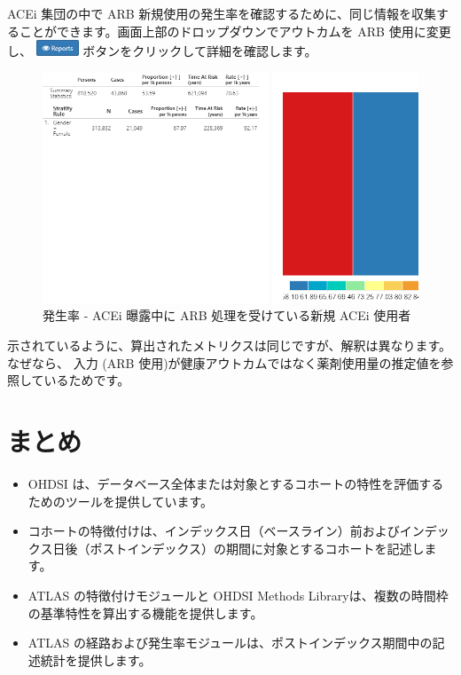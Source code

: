 \documentclass[
  11pt]{book}
\makeatletter
\newenvironment{kframe}{%
\medskip{}
\setlength{\fboxsep}{.8em}
 \def\at@end@of@kframe{}%
 \ifinner\ifhmode%
  \def\at@end@of@kframe{\end{minipage}}%
  \begin{minipage}{\columnwidth}%
 \fi\fi%
 \def\FrameCommand##1{\hskip\@totalleftmargin \hskip-\fboxsep
 \colorbox{myShadeColor}{##1}\hskip-\fboxsep
     \hskip-\linewidth \hskip-\@totalleftmargin \hskip\columnwidth}%
 \MakeFramed {\advance\hsize-\width
   \@totalleftmargin\z@ \linewidth\hsize
   \@setminipage}}%
 {\par\unskip\endMakeFramed%
 \at@end@of@kframe}
\newenvironment{rmdblock}[1]
  {
  \begin{itemize}
  \renewcommand{\labelitemi}{
    \raisebox{-.7\height}[0pt][0pt]{
      {\setkeys{Gin}{width=3em,keepaspectratio}\texttt{[image: images/\#1]}}
    }
  }
  \setlength{\fboxsep}{1em}
  \begin{kframe}
  \item
  }
  {
  \end{kframe}
  \end{itemize}
  }
\newenvironment{rmdsummary}
  {\begin{rmdblock}{summary}}
  {\end{rmdblock}}
\theoremstyle{definition}
\theoremstyle{definition}
\theoremstyle{definition}
\theoremstyle{definition}
\theoremstyle{remark}
\makeatother
\begin{document}
ACEi 集団の中で ARB 新規使用の発生率を確認するために、同じ情報を収集することができます。画面上部のドロップダウンでアウトカムを ARB 使用に変更し、 \includegraphics{images/Characterization/atlasIncidenceReportButton.png} ボタンをクリックして詳細を確認します。

\begin{figure}

{\centering \includegraphics[width=1\linewidth]{images/Characterization/atlasIncidenceResultsARB} 

}

\caption{発生率 - ACEi 曝露中に ARB 処理を受けている新規 ACEi 使用者}\label{fig:atlasIncidenceResultsARB}
\end{figure}

示されているように、算出されたメトリクスは同じですが、解釈は異なります。なぜなら、 入力 (ARB 使用)が健康アウトカムではなく薬剤使用量の推定値を参照しているためです。

\section{まとめ}\label{ux307eux3068ux3081-8}

\begin{rmdsummary}
\begin{itemize}
\item
  OHDSI は、データベース全体または対象とするコホートの特性を評価するためのツールを提供しています。
\item
  コホートの特徴付けは、インデックス日（ベースライン）前およびインデックス日後（ポストインデックス）の期間に対象とするコホートを記述します。
\item
  ATLAS の特徴付けモジュールと OHDSI Methods Libraryは、複数の時間枠の基準特性を算出する機能を提供します。
\item
  ATLAS の経路および発生率モジュールは、ポストインデックス期間中の記述統計を提供します。
\end{itemize}
\end{rmdsummary}
\end{document}
